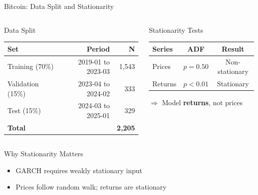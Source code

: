 \documentclass[9pt, aspectratio=169, t]{beamer}
\begin{document}
\begin{frame}{Bitcoin: Data Split and Stationarity}
    \begin{columns}[T]
        \begin{block}{Data Split}
            \begin{center}
            \begin{tabular}{lrr}
                \toprule
                \textbf{Set} & \textbf{Period} & \textbf{N} \\
                \midrule
                Training (70\%) & 2019-01 to 2023-03 & 1,543 \\
                Validation (15\%) & 2023-04 to 2024-02 & 333 \\
                Test (15\%) & 2024-03 to 2025-01 & 329 \\
                \midrule
                \textbf{Total} & & \textbf{2,205} \\
                \bottomrule
            \end{tabular}
            \end{center}
        \end{block}

        \begin{block}{Stationarity Tests}
            \begin{center}
            \begin{tabular}{lcc}
                \toprule
                \textbf{Series} & \textbf{ADF} & \textbf{Result} \\
                \midrule
                Prices & $p = 0.50$ & Non-stationary \\
                Returns & $p < 0.01$ & \textcolor{Forest}{Stationary} \\
                \bottomrule
            \end{tabular}
            \end{center}

            \vspace{0.3cm}

            $\Rightarrow$ Model \textbf{returns}, not prices
        \end{block}
    \end{columns}

    \vspace{0.3cm}

    \begin{alertblock}{Why Stationarity Matters}
        \begin{itemize}\setlength{\itemsep}{0pt}
            \item GARCH requires weakly stationary input
            \item Prices follow random walk; returns are stationary
        \end{itemize}
    \end{alertblock}
\end{frame}
\end{document}
